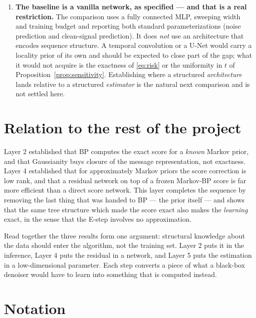 \documentclass[11pt]{article}
\theoremstyle{remark}
\begin{document}
\begin{enumerate}[leftmargin=*]
  complicated enough that the chain family were itself a poor description.
\item \textbf{The baseline is a vanilla network, as specified --- and that is a
  real restriction.} The comparison uses a fully connected MLP, sweeping width
  and training budget and reporting both standard parameterizations (noise
  prediction and clean-signal prediction). It does \emph{not} use an
  architecture that encodes sequence structure. A temporal convolution or a
  U-Net would carry a locality prior of its own and should be expected to close
  part of the gap; what it would not acquire is the exactness of
  \eqref{eq:risk} or the uniformity in $t$ of Proposition~\ref{prop:sensitivity}.
  Establishing where a structured \emph{architecture} lands relative to a
  structured \emph{estimator} is the natural next comparison and is not settled
  here.
\end{enumerate}

\section{Relation to the rest of the project}

Layer 2 established that BP computes the exact score for a \emph{known} Markov
prior, and that Gaussianity buys closure of the message representation, not
exactness. Layer 4 established that for approximately Markov priors the score
correction is low rank, and that a residual network on top of a frozen
Markov-BP score is far more efficient than a direct score network. This layer
completes the sequence by removing the last thing that was handed to BP --- the
prior itself --- and shows that the same tree structure which made the score
exact also makes the \emph{learning} exact, in the sense that the E-step
involves no approximation.

Read together the three results form one argument: structural knowledge about
the data should enter the algorithm, not the training set. Layer 2 puts it in
the inference, Layer 4 puts the residual in a network, and Layer 5 puts the
estimation in a low-dimensional parameter. Each step converts a piece of what a
black-box denoiser would have to learn into something that is computed instead.

\appendix
\section{Notation}
\end{document}
